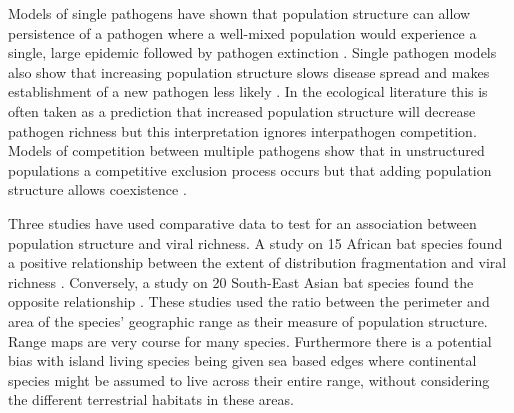 



Models of single pathogens have shown that population structure can allow persistence of a pathogen where a well-mixed population would experience a single, large epidemic followed by pathogen extinction \cite{blackwood2013resolving, pons2014insights, plowright2011urban}.
Single pathogen models also show that increasing population structure slows disease spread and makes establishment of a new pathogen less likely \cite{colizza2007invasion, vespignani2008reaction}.
In the ecological literature this is often taken as a prediction that increased population structure will decrease pathogen richness \cite{nunn2003comparative, morand2000wormy, poulin2014parasite, poulin2000diversity, altizer2003social} but this interpretation ignores interpathogen competition.
Models of competition between multiple pathogens show that in unstructured populations a competitive exclusion process occurs but that adding population structure allows coexistence \cite{qiu2013vector, allen2004sis, nunes2006localized}.

\sloppy
Three studies have used comparative data to test for an association between population structure and viral richness.
A study on 15 African bat species found a positive relationship between the extent of distribution fragmentation and viral richness \cite{maganga2014bat}.
Conversely, a study on 20 South-East Asian bat species found the opposite relationship \cite{gay2014parasite}. 
These studies used the ratio between the perimeter and area of the species' geographic range as their measure of population structure.
Range maps are very course for many species.
Furthermore there is a potential bias with island living species being given sea based edges where continental species might be assumed to live across their entire range, without considering the different terrestrial habitats in these areas.

